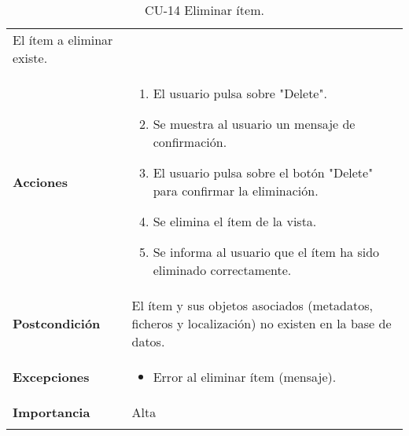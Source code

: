 \begin{longtable}[]{@{}ll@{}}
\begin{minipage}[t]{0.74\columnwidth}
El ítem a eliminar existe.\strut
\end{minipage}\tabularnewline
\begin{minipage}[t]{0.20\columnwidth}\raggedright
\textbf{Acciones}\strut
\end{minipage} & \begin{minipage}[t]{0.74\columnwidth}\raggedright
\begin{enumerate}
\def\labelenumi{\arabic{enumi}.}
\tightlist
\item
  El usuario pulsa sobre "Delete".
\item
  Se muestra al usuario un mensaje de confirmación.
\item
  El usuario pulsa sobre el botón "Delete" para confirmar la
  eliminación.
\item
  Se elimina el ítem de la vista.
\item
  Se informa al usuario que el ítem ha sido eliminado correctamente.
\end{enumerate}\strut
\end{minipage}\tabularnewline
\begin{minipage}[t]{0.20\columnwidth}\raggedright
\textbf{Postcondición}\strut
\end{minipage} & \begin{minipage}[t]{0.74\columnwidth}\raggedright
El ítem y sus objetos asociados (metadatos, ficheros y localización) no
existen en la base de datos.\strut
\end{minipage}\tabularnewline
\begin{minipage}[t]{0.20\columnwidth}\raggedright
\textbf{Excepciones}\strut
\end{minipage} & \begin{minipage}[t]{0.74\columnwidth}\raggedright
\begin{itemize}
\tightlist
\item
  Error al eliminar ítem (mensaje).
\end{itemize}\strut
\end{minipage}\tabularnewline
\begin{minipage}[t]{0.20\columnwidth}\raggedright
\textbf{Importancia}\strut
\end{minipage} & \begin{minipage}[t]{0.74\columnwidth}\raggedright
Alta\strut
\end{minipage}\tabularnewline
\bottomrule
\caption{CU-14 Eliminar ítem.}
\end{longtable}

